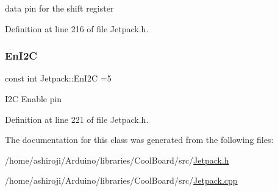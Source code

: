 data pin for the shift register 

Definition at line 216 of file Jetpack.\+h.

\mbox{\label{class_jetpack_a81df984fb4cea98c71aa1a1cfcdfe814}} 
\subsubsection{\texorpdfstring{En\+I2C}{EnI2C}}
{\footnotesize\ttfamily const int Jetpack\+::\+En\+I2C =5\hspace{0.3cm}{\ttfamily [private]}}

I2C Enable pin 

Definition at line 221 of file Jetpack.\+h.



The documentation for this class was generated from the following files\+:\begin{DoxyCompactItemize}
\item 
/home/ashiroji/\+Arduino/libraries/\+Cool\+Board/src/\hyperlink{_jetpack_8h}{Jetpack.\+h}\item 
/home/ashiroji/\+Arduino/libraries/\+Cool\+Board/src/\hyperlink{_jetpack_8cpp}{Jetpack.\+cpp}\end{DoxyCompactItemize}
